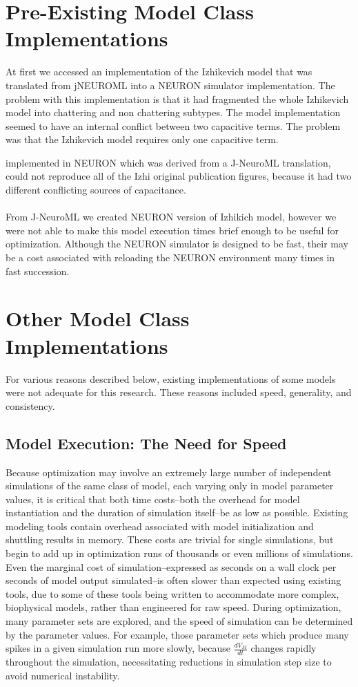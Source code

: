
\section{Pre-Existing Model Class Implementations}
At first we accessed an implementation of the Izhikevich model that was translated from jNEUROML into a NEURON simulator implementation. The problem with this implementation is that it had fragmented the whole Izhikevich model into chattering and non chattering subtypes. The model implementation seemed to have an internal conflict between two capacitive terms. The problem was that the Izhikevich model requires only one capacitive term.

implemented in NEURON which was derived from a J-NeuroML translation, could not reproduce all of the Izhi original publication figures, because it had two different conflicting sources of capacitance.\\
\\
From J-NeuroML we created NEURON version of Izhikich model, however we were not able to make this model execution times brief enough to be useful for optimization. Although the NEURON simulator is designed to be fast, their may be a cost associated with reloading the NEURON environment many times in fast succession.


\section{Other Model Class Implementations}
For various reasons described below, existing implementations of some models were not adequate for this research.
These reasons included speed, generality, and consistency.

\subsection{Model Execution: The Need for Speed}
Because optimization may involve an extremely large number of independent simulations of the same class of model, each varying only in model parameter values, it is critical that both time costs--both the overhead for model instantiation and the duration of simulation itself--be as low as possible.
Existing modeling tools contain overhead associated with model initialization and shuttling results in memory.
These costs are trivial for single simulations, but begin to add up in optimization runs of thousands or even millions of simulations.  
Even the marginal cost of simulation--expressed as seconds on a wall clock per seconds of model output simulated--is often slower than expected using existing tools, due to some of these tools being written to accommodate more complex, biophysical models, rather than engineered for raw speed.
During optimization, many parameter sets are explored, and the speed of  simulation can be determined by the parameter values.
For example, those parameter sets which produce many spikes in a given simulation run more slowly, because $\frac{dV_{M}}{dt}$ changes rapidly throughout the simulation, necessitating reductions in simulation step size to avoid numerical instability.

